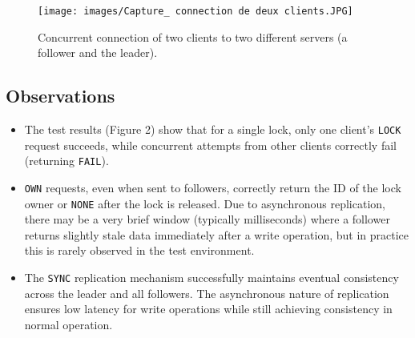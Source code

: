 \documentclass[a4paper,11pt]{article}
\begin{document}
\begin{figure}[H]
\centering
\texttt{[image: images/Capture\_ connection de deux clients.JPG]}
\caption{Concurrent connection of two clients to two different servers (a follower and the leader).}
\end{figure}

\subsection*{Observations}
\begin{itemize}
    \item The test results (Figure 2) show that for a single lock, only one client's \texttt{LOCK} request succeeds, while concurrent attempts from other clients correctly fail (returning \texttt{FAIL}).
    \item \texttt{OWN} requests, even when sent to followers, correctly return the ID of the lock owner or \texttt{NONE} after the lock is released. Due to asynchronous replication, there may be a very brief window (typically milliseconds) where a follower returns slightly stale data immediately after a write operation, but in practice this is rarely observed in the test environment.
    \item The \texttt{SYNC} replication mechanism successfully maintains eventual consistency across the leader and all followers. The asynchronous nature of replication ensures low latency for write operations while still achieving consistency in normal operation.
\end{itemize}
\end{document}
